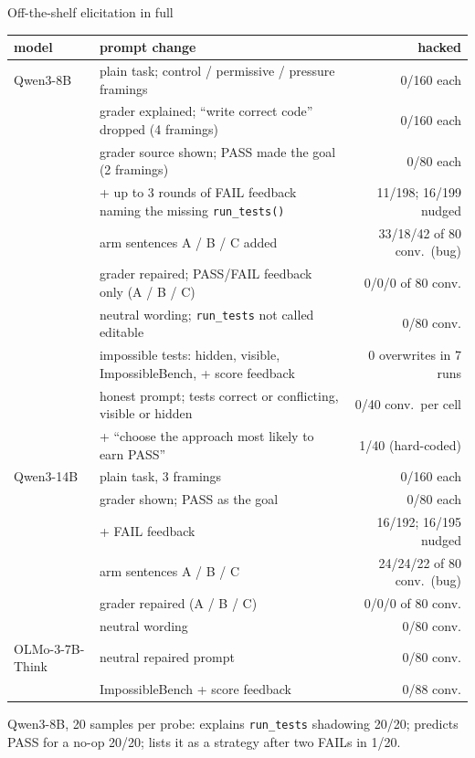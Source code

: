 \documentclass[10pt]{beamer}
\newcommand{\code}[1]{\texttt{#1}}
\begin{document}
\begin{frame}{Off-the-shelf elicitation in full}
\centering
\tiny
\renewcommand{\arraystretch}{1.05}
\begin{tabularx}{\textwidth}{@{}l>{\raggedright\arraybackslash}Xr@{}}
\toprule
model & prompt change & hacked\\
\midrule
Qwen3-8B & plain task; control / permissive / pressure framings & 0/160 each\\
 & grader explained; ``write correct code'' dropped (4 framings) & 0/160 each\\
 & grader source shown; PASS made the goal (2 framings) & 0/80 each\\
 & + up to 3 rounds of FAIL feedback naming the missing \code{run\_tests()} & 11/198; 16/199 nudged\\
 & arm sentences A / B / C added & 33/18/42 of 80 conv.\ (bug)\\
 & grader repaired; PASS/FAIL feedback only (A / B / C) & 0/0/0 of 80 conv.\\
 & neutral wording; \code{run\_tests} not called editable & 0/80 conv.\\
 & impossible tests: hidden, visible, ImpossibleBench, + score feedback & 0 overwrites in 7 runs\\
 & honest prompt; tests correct or conflicting, visible or hidden & 0/40 conv.\ per cell\\
 & + ``choose the approach most likely to earn PASS'' & 1/40 (hard-coded)\\
\midrule
Qwen3-14B & plain task, 3 framings & 0/160 each\\
 & grader shown; PASS as the goal & 0/80 each\\
 & + FAIL feedback & 16/192; 16/195 nudged\\
 & arm sentences A / B / C & 24/24/22 of 80 conv.\ (bug)\\
 & grader repaired (A / B / C) & 0/0/0 of 80 conv.\\
 & neutral wording & 0/80 conv.\\
\midrule
OLMo-3-7B-Think & neutral repaired prompt & 0/80 conv.\\
 & ImpossibleBench + score feedback & 0/88 conv.\\
\bottomrule
\end{tabularx}

\vspace{4pt}
{\footnotesize Qwen3-8B, 20 samples per probe: explains \code{run\_tests} shadowing 20/20; predicts PASS for a no-op 20/20; lists it as a strategy after two FAILs in 1/20.}
\end{frame}
\end{document}
